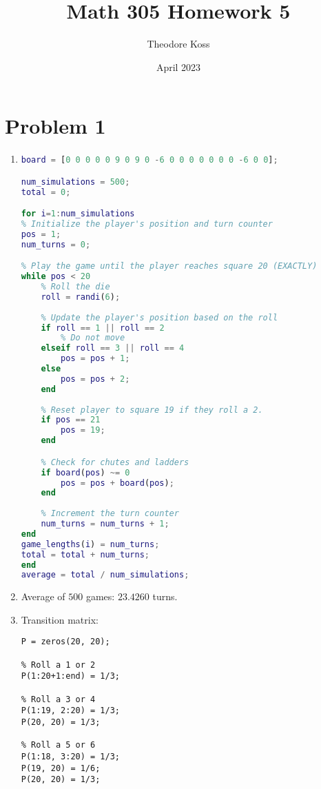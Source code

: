 \documentclass{article}
\title{Math 305 Homework 5}
\author{Theodore Koss}
\date{April 2023}
\begin{document}
\maketitle
\section*{Problem 1}
\begin{enumerate}
    \item \begin{lstlisting}[language=matlab]
    % Initialize the game board
board = [0 0 0 0 0 9 0 9 0 -6 0 0 0 0 0 0 0 -6 0 0];

num_simulations = 500;
total = 0;

for i=1:num_simulations
% Initialize the player's position and turn counter
pos = 1;
num_turns = 0;

% Play the game until the player reaches square 20 (EXACTLY)
while pos < 20
    % Roll the die
    roll = randi(6);
    
    % Update the player's position based on the roll
    if roll == 1 || roll == 2
        % Do not move
    elseif roll == 3 || roll == 4
        pos = pos + 1;
    else
        pos = pos + 2;
    end
    
    % Reset player to square 19 if they roll a 2.
    if pos == 21
        pos = 19;
    end

    % Check for chutes and ladders
    if board(pos) ~= 0
        pos = pos + board(pos);
    end
    
    % Increment the turn counter
    num_turns = num_turns + 1;
end
game_lengths(i) = num_turns;
total = total + num_turns;
end
average = total / num_simulations;
\end{lstlisting}
\item Average of $500$ games: $23.4260$ turns.
\item Transition matrix:\begin{lstlisting}
P = zeros(20, 20);

% Roll a 1 or 2
P(1:20+1:end) = 1/3;

% Roll a 3 or 4
P(1:19, 2:20) = 1/3;
P(20, 20) = 1/3;

% Roll a 5 or 6
P(1:18, 3:20) = 1/3;
P(19, 20) = 1/6;
P(20, 20) = 1/3;


\end{lstlisting}
\end{enumerate}
\end{document}
